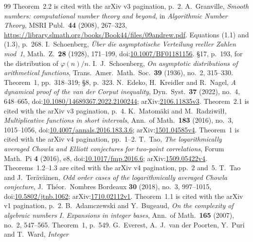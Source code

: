 \begin{thebibliography}{99}
Theorem~2.2 is cited with the arXiv v3 pagination, p.~2.
A.~Granville, \emph{Smooth numbers: computational number theory and beyond},
in \emph{Algorithmic Number Theory}, MSRI Publ.\ \textbf{44} (2008), 267--323,
\url{https://library.slmath.org/books/Book44/files/09andrew.pdf}.
Equations (1.1) and (1.3), p.~268.
I.~Schoenberg, \emph{\"Uber die asymptotische Verteilung reeller Zahlen
mod~1}, Math.\ Z.\ \textbf{28} (1928), 171--199,
doi:\href{https://doi.org/10.1007/BF01181156}{10.1007/BF01181156}.
\S17, p.~193, for the distribution of $\varphi(n)/n$.
I.~J.~Schoenberg, \emph{On asymptotic distributions of arithmetical
functions}, Trans.\ Amer.\ Math.\ Soc.\ \textbf{39} (1936), no.~2, 315--330.
Theorem~1, pp.~318--319; \S8, p.~323.
N.~Edeko, H.~Kreidler and R.~Nagel, \emph{A dynamical proof of the van der
Corput inequality}, Dyn.\ Syst.\ \textbf{37} (2022), no.~4, 648--665,
doi:\href{https://doi.org/10.1080/14689367.2022.2100244}{10.1080/14689367.2022.2100244};
arXiv:\href{https://arxiv.org/abs/2106.11835v3}{2106.11835v3}.
Theorem~2.1 is cited with the arXiv v3 pagination, p.~4.
K.~Matom\"aki and M.~Radziwi\l\l, \emph{Multiplicative functions in short
intervals}, Ann.\ of Math.\ \textbf{183} (2016), no.~3, 1015--1056,
doi:\href{https://doi.org/10.4007/annals.2016.183.3.6}{10.4007/annals.2016.183.3.6};
arXiv:\href{https://arxiv.org/abs/1501.04585v4}{1501.04585v4}.
Theorem~1 is cited with the arXiv v4 pagination, pp.~1--2.
T.~Tao, \emph{The logarithmically averaged Chowla and Elliott conjectures for
two-point correlations}, Forum Math.\ Pi \textbf{4} (2016), e8,
doi:\href{https://doi.org/10.1017/fmp.2016.6}{10.1017/fmp.2016.6};
arXiv:\href{https://arxiv.org/abs/1509.05422v4}{1509.05422v4}.
Theorems~1.2--1.3 are cited with the arXiv v4 pagination, pp.~2 and~5.
T.~Tao and J.~Ter\"av\"ainen, \emph{Odd order cases of the logarithmically
averaged Chowla conjecture}, J.\ Th\'eor.\ Nombres Bordeaux \textbf{30}
(2018), no.~3, 997--1015,
doi:\href{https://doi.org/10.5802/jtnb.1062}{10.5802/jtnb.1062};
arXiv:\href{https://arxiv.org/abs/1710.02112v1}{1710.02112v1}.
Theorem~1.1 is cited with the arXiv v1 pagination, p.~2.
B.~Adamczewski and Y.~Bugeaud, \emph{On the complexity of algebraic numbers
I. Expansions in integer bases}, Ann.\ of Math.\ \textbf{165} (2007), no.~2,
547--565. Theorem~1, p.~549.
G.~Everest, A.~J.~van der Poorten, Y.~Puri and T.~Ward, \emph{Integer
}
\end{thebibliography}
